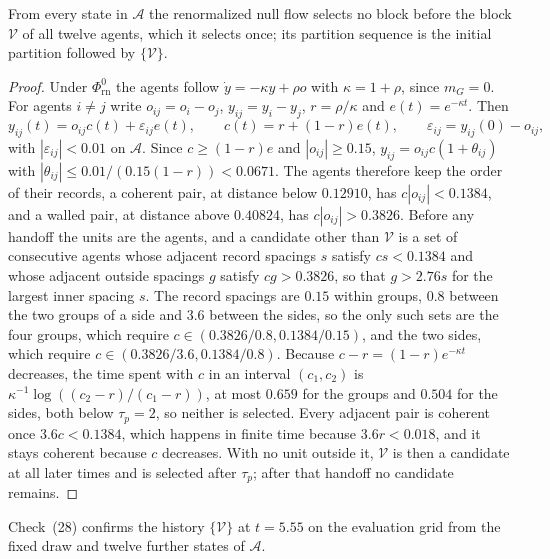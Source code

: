 \documentclass[11pt,letterpaper]{report}
\begin{document}
From every state in $\mathcal A$ the renormalized null flow selects no block before the block $\mathcal V$ of all twelve agents, which it selects once; its partition sequence is the initial partition followed by $\{\mathcal V\}$.
\begin{proof}
Under $\Phi^0_{\mathrm{rn}}$ the agents follow $\dot y=-\kappa y+\rho o$ with $\kappa=1+\rho$, since $m_G=0$. For agents $i\ne j$ write $o_{ij}=o_i-o_j$, $y_{ij}=y_i-y_j$, $r=\rho/\kappa$ and $e(t)=e^{-\kappa t}$. Then
\begin{equation}
y_{ij}(t)=o_{ij}c(t)+\varepsilon_{ij}e(t),\qquad c(t)=r+(1-r)e(t),\qquad\varepsilon_{ij}=y_{ij}(0)-o_{ij},
\end{equation}
with $|\varepsilon_{ij}|<0.01$ on $\mathcal A$. Since $c\ge(1-r)e$ and $|o_{ij}|\ge0.15$, $y_{ij}=o_{ij}c(1+\theta_{ij})$ with $|\theta_{ij}|\le0.01/(0.15(1-r))<0.0671$. The agents therefore keep the order of their records, a coherent pair, at distance below $0.12910$, has $c|o_{ij}|<0.1384$, and a walled pair, at distance above $0.40824$, has $c|o_{ij}|>0.3826$. Before any handoff the units are the agents, and a candidate other than $\mathcal V$ is a set of consecutive agents whose adjacent record spacings $s$ satisfy $cs<0.1384$ and whose adjacent outside spacings $g$ satisfy $cg>0.3826$, so that $g>2.76s$ for the largest inner spacing $s$. The record spacings are $0.15$ within groups, $0.8$ between the two groups of a side and $3.6$ between the sides, so the only such sets are the four groups, which require $c\in(0.3826/0.8,0.1384/0.15)$, and the two sides, which require $c\in(0.3826/3.6,0.1384/0.8)$. Because $c-r=(1-r)e^{-\kappa t}$ decreases, the time spent with $c$ in an interval $(c_1,c_2)$ is $\kappa^{-1}\log((c_2-r)/(c_1-r))$, at most $0.659$ for the groups and $0.504$ for the sides, both below $\tau_p=2$, so neither is selected. Every adjacent pair is coherent once $3.6c<0.1384$, which happens in finite time because $3.6r<0.018$, and it stays coherent because $c$ decreases. With no unit outside it, $\mathcal V$ is then a candidate at all later times and is selected after $\tau_p$; after that handoff no candidate remains.
\end{proof}

Check~(28) confirms the history $\{\mathcal V\}$ at $t=5.55$ on the evaluation grid from the fixed draw and twelve further states of $\mathcal A$.
\end{document}
